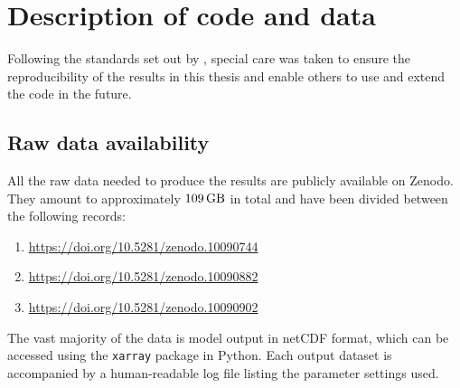\documentclass[../main.tex]{subfiles}
\begin{document}
\ifSubfilesClassLoaded{
    \frontmatter
    \tableofcontents
    \mainmatter
}{}

\appendix
\chapter{Description of code and data} \label{chap:computations}
Following the standards set out by \textcite{irving2018}, special care was
taken to ensure the reproducibility of the results in this thesis and enable
others to use and extend the code in the future.

\section{Raw data availability}
All the raw data needed to produce the results are publicly available on
Zenodo. They amount to approximately $\SI{109}{\giga\byte}$ in total and
have been divided between the following records:
\begin{enumerate}
    \item \url{https://doi.org/10.5281/zenodo.10090744}
    \item \url{https://doi.org/10.5281/zenodo.10090882}
    \item \url{https://doi.org/10.5281/zenodo.10090902}
\end{enumerate}
The vast majority of the data is model output in netCDF format, which can
be accessed using the \texttt{xarray} package in Python. Each output dataset
is accompanied by a human-readable log file listing the parameter settings
used.
\end{document}
